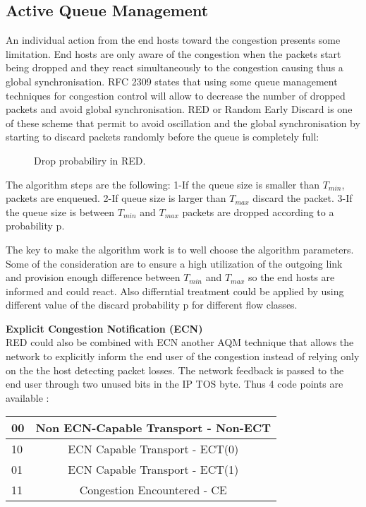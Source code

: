 \subsection{Active Queue Management}

An individual action from the end hosts toward the congestion presents some limitation. End hosts are only aware of the congestion when the packets start being dropped and they react simultaneously to the congestion causing thus a global synchronisation. RFC 2309 states that using some queue management techniques for congestion control will allow to decrease the number of dropped packets and avoid global synchronisation. 
RED or Random Early Discard is one of these scheme that permit to avoid oscillation and the global synchronisation by starting to discard packets randomly before the queue is completely full:

 \begin{figure}[h]
  \begin{center}
\caption{
  Drop probabiliry in RED.
    \label{fig:RED}
}
 \end{center}
\end{figure}

The algorithm steps are the following:
1-If the queue size is smaller than $T_{min}$, packets are enqueued.
2-If queue size is larger than $T_{max}$ discard the packet.
3-If the queue size is between $T_{min}$ and $T_{max}$ packets are dropped according to a probability p.

The key to make the algorithm work is to well choose the algorithm parameters. Some of the consideration are to ensure a high utilization of the outgoing link and provision enough difference between $T_{min}$ and $T_{max}$ so the end hosts are informed and could react. Also differntial treatment could be applied by using different value of the discard probability p for different flow classes. 

{\bf Explicit Congestion Notification (ECN)}
\\RED could also be combined with ECN \cite {RFC 2481} another AQM technique that allows the network to explicitly inform the end user of the congestion instead of relying only on the the host detecting packet losses. The network feedback is passed to the end user through two unused bits in the IP TOS byte.  Thus 4 code points are available :\\

\begin{center}
\begin{tabular}{| l | c| } \hline 
00 & Non ECN-Capable Transport - Non-ECT \\ \hline 
10 & ECN Capable Transport - ECT(0) \\ \hline 
01 & ECN Capable Transport - ECT(1) \\ \hline 
11 & Congestion Encountered - CE  \\ \hline 
\end{tabular}
\\
\caption{
  ECN codepoint.
    \label{fig:ECN}
}
\end{center}

